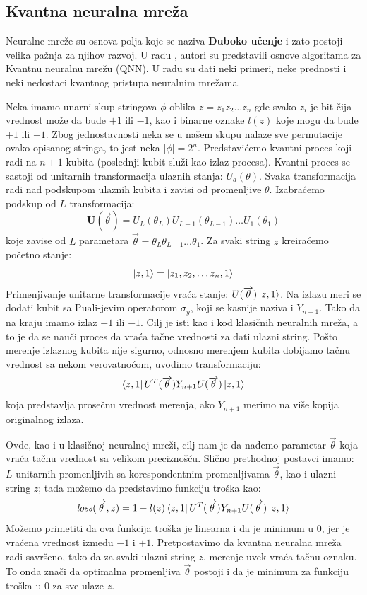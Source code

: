 \documentclass[12pt, letterpaper, oneside]{article}
\begin{document}
\subsection{Kvantna neuralna mreža}
Neuralne mreže su osnova polja koje se naziva \textbf{Duboko učenje} i zato postoji velika pažnja za njihov razvoj.
U radu \cite{Classification_wit_QNN}, autori su predstavili osnove algoritama za Kvantnu neuralnu mrežu (QNN).
U radu su dati neki primeri, neke prednosti i neki nedostaci kvantnog pristupa neuralnim mrežama.

Neka imamo unarni skup stringova $\phi$ oblika $z=z_1 z_2 \dots z_n$ gde svako $z_i$ je bit čija vrednost može da bude $+1$ ili $-1$,
kao i binarne oznake $l(z)$ koje mogu da bude $+1$ ili $-1$. Zbog jednostavnosti neka se u našem skupu nalaze sve permutacije ovako opisanog stringa, to jest neka $|\phi|=2^n$.
Predstavićemo kvantni proces koji radi na $n+1$ kubita (poslednji kubit služi kao izlaz procesa). Kvantni proces se sastoji od unitarnih transformacija ulaznih stanja: ${U_a(\theta)}$.
Svaka transformacija radi nad podskupom ulaznih kubita i zavisi od promenljive $\theta$. Izabraćemo podskup od $L$ transformacija:
\[
  \mathbf{U}(\overrightarrow{\theta}) = U_{L}(\theta_{L}) U_{L-1}(\theta_{L-1}) \dots U_{1}(\theta_{1}) 
\]
koje zavise od $L$ parametara $\overrightarrow{\theta}=\theta_{L} \theta_{L-1} \dots \theta_{1}$. Za svaki string $z$ kreiraćemo početno stanje:
\[
    \Ket{z,1} = \Ket{z_1, z_2, \dots z_n, 1}
\]
Primenjivanje unitarne transformacije vraća stanje: $U(\overrightarrow{\theta})\Ket{z,1}$.
Na izlazu meri se dodati kubit sa Puali-jevim operatorom $\sigma_y$, koji se kasnije naziva i $Y_{n+1}$.
Tako da na kraju imamo izlaz $+1$ ili $-1$. Cilj je isti kao i kod klasičnih neuralnih mreža, a to je da se nauči proces da vraća tačne vrednosti za dati ulazni string.
Pošto merenje izlaznog kubita nije sigurno, odnosno merenjem kubita dobijamo tačnu vrednost sa nekom verovatnoćom, uvodimo transformaciju:
\[
    \bra{z,1}U^T(\overrightarrow{\theta})Y_{n+1}U(\overrightarrow{\theta})\Ket{z,1}
\]
koja predstavlja prosečnu vrednost merenja, ako $Y_{n+1}$ merimo na više kopija originalnog izlaza.

Ovde, kao i u klasičnoj neuralnoj mreži, cilj nam je da nađemo parametar $\overrightarrow{\theta}$ koja vraća tačnu vrednost sa velikom preciznošću.
Slično prethodnoj postavci imamo: $L$ unitarnih promenljivih sa korespondentnim promenljivama $\overrightarrow{\theta}$, kao i ulazni string $z$; 
tada možemo da predstavimo funkciju troška kao:
\[
    \mathit{loss}(\overrightarrow{\theta},z) = 1 - l(z)\bra{z,1}U^T(\overrightarrow{\theta})Y_{n+1}U(\overrightarrow{\theta})\Ket{z,1}
\]
Možemo primetiti da ova funkcija troška je linearna i da je minimum u $0$, jer je vraćena vrednost između $-1$ i $+1$.
Pretpostavimo da kvantna neuralna mreža radi savršeno, tako da za svaki ulazni string $z$, merenje uvek vraća tačnu oznaku.
To onda znači da optimalna promenljiva $\overrightarrow{\theta}$ postoji i da je minimum za funkciju troška u $0$ za sve ulaze $z$.
\end{document}
